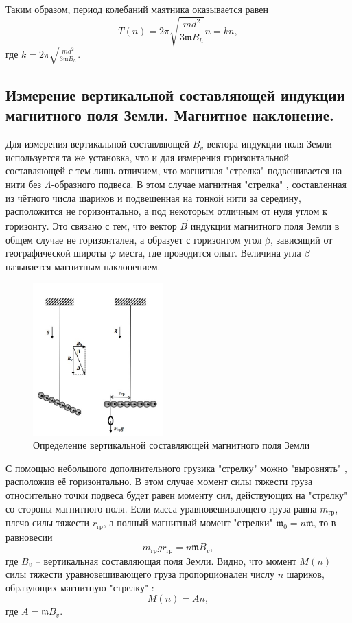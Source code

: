 \documentclass[a4paper,12pt]{article}
\begin{document}
Таким образом, период колебаний маятника оказывается равен\[T(n)=2\pi\sqrt{\frac{md^2}{3\mathfrak{m}B_h}}n=kn,\]где $k=2\pi\sqrt{\frac{md^2}{3\mathfrak{m}B_h}}$.

\subsection*{Измерение вертикальной составляющей индукции магнитного поля Земли. Магнитное наклонение.}

Для измерения вертикальной составляющей $B_v$ вектора индукции поля Земли используется та же установка, что и для измерения горизонтальной составляющей с тем лишь отличием, что магнитная "стрелка" подвешивается на нити без $\Lambda$-образного подвеса. В этом случае магнитная "стрелка" , составленная из чётного числа шариков и подвешенная на тонкой нити за середину, расположится не горизонтально, а под некоторым отличным от нуля углом к горизонту. Это связано с тем, что вектор $\vec{B}$ индукции магнитного поля Земли в общем случае не горизонтален, а образует с горизонтом угол $\beta$, зависящий от географической широты $\varphi$ места, где проводится опыт. Величина угла $\beta$ называется магнитным наклонением.

\begin{figure}
	\includegraphics[width=5cm]{vert.jpg}
	\caption{Определение вертикальной составляющей магнитного поля Земли}
	\label{mahovik}
\end{figure}

С помощью небольшого дополнительного грузика "стрелку" можно "выровнять" , расположив её горизонтально. В этом случае момент силы тяжести груза относительно точки подвеса будет равен моменту сил, действующих на "стрелку" со стороны магнитного поля. Если масса уравновешивающего груза равна $m_{\text{гр}}$, плечо силы тяжести $r_{\text{гр}}$, а полный магнитный момент "стрелки" $\mathfrak{m}_0=n\mathfrak{m}$, то в равновесии\[m_{\text{гр}}gr_{\text{гр}}=n\mathfrak{m}B_v,\]где $B_v$ -- вертикальная составляющая поля Земли. Видно, что момент $M(n)$ силы тяжести уравновешивающего груза пропорционален числу $n$ шариков, образующих магнитную "стрелку" :\[M(n)=An,\]где $A=\mathfrak{m}B_v$.
\end{document}
